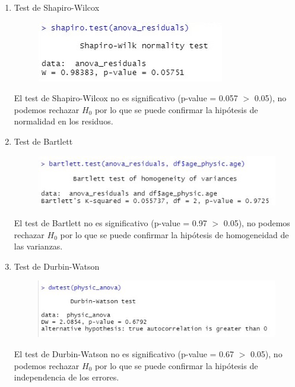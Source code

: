 \documentclass[a4paper,10pt,twocolumn]{article}
\begin{document}
\begin{enumerate}
	\item Test de Shapiro-Wilcox
	
	\begin{figure}[h]
		\includegraphics[scale=0.7]{./imgs/anova_shapiro.jpg}
	\end{figure}
	
	El test de Shapiro-Wilcox no es significativo (p-value = 0.057 $>$ 0.05), no podemos rechazar $H_{0}$ por lo que se puede confirmar la hipótesis de normalidad en los residuos.
	
	\item Test de Bartlett
	
	\begin{figure}[h]
		\includegraphics[scale=0.65]{./imgs/anova_bartlett.jpg}
	\end{figure}
	
	El test de Bartlett no es significativo (p-value = 0.97 $>$ 0.05), no podemos rechazar $H_{0}$ por lo que se puede confirmar la hipótesis de homogeneidad de las varianzas.
	
	\item Test de Durbin-Watson
	
	\begin{figure}[h]
		\includegraphics[scale=0.63]{./imgs/anova_dw.jpg}
	\end{figure}
	
	El test de Durbin-Watson no es significativo (p-value = 0.67 $>$ 0.05), no podemos rechazar $H_{0}$ por lo que se puede confirmar la hipótesis de independencia de los errores.
	
\end{enumerate}
\end{document}
